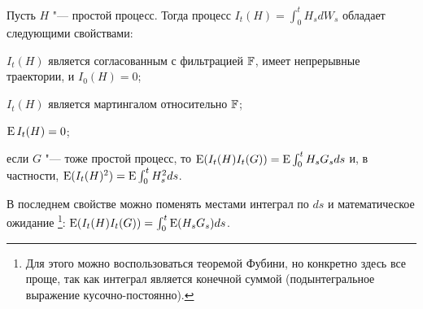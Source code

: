 \begin{proposition}
Пусть $H$ "--- простой процесс.
Тогда процесс $I_t(H) = \int_0^t H_s dW_s$ обладает следующими свойствами:
\begin{alphenum}
\item $I_t(H)$ является согласованным с фильтрацией $\mathbb{F}$, имеет непрерывные траектории, и $I_0(H) = 0$;
\item $I_t(H)$ является мартингалом относительно $\mathbb{F}$;
\item $\operatorname{E} I_t(H) = 0$;
\item если $G$ "--- тоже простой процесс, то $\operatorname{E}(I_t(H)I_t(G)) = \operatorname{E} \int_0^t H_sG_s ds$ и, в частности, $\operatorname{E}(I_t(H)^2) = \operatorname{E} \int_0^t H_s^2 ds$.
\end{alphenum}
\end{proposition}

\begin{remark}
В последнем свойстве можно поменять местами интеграл по $ds$ и математическое ожидание%
\footnote{Для этого можно воспользоваться теоремой Фубини, но конкретно здесь все проще, так как интеграл является конечной суммой (подынтегральное выражение кусочно-постоянно).}:
$\operatorname{E}(I_t(H)I_t(G)) = \int_0^t \operatorname{E}(H_sG_s) ds$.  
\end{remark}

